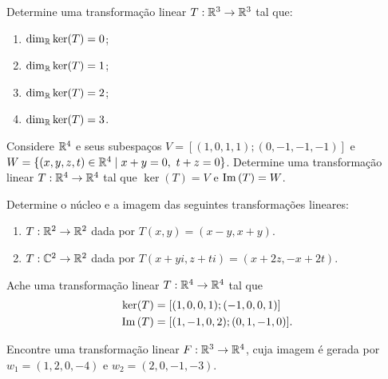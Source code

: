 \documentclass[12pt]{exam}
\begin{document}
\begin{exercicio}
    Determine uma transformação linear $T : \mathbb{R}^3 \to \mathbb{R}^3$ tal que:
    \begin{enumerate}[label={\alph*})]
        \item $\dim_{\mathbb{R}} \ker(T) = 0$;

        \item $\dim_{\mathbb{R}} \ker(T) = 1$;

        \item $\dim_{\mathbb{R}} \ker(T) = 2$;

        \item $\dim_{\mathbb{R}} \ker(T) = 3$.
    \end{enumerate}
\end{exercicio}

\begin{exercicio}
    Considere $\mathbb{R}^4$ e seus subespaços $V = [(1,0,1,1);(0,-1,-1,-1)]$ e $W = \{(x,y,z,t) \in \mathbb{R}^4 \mid x + y = 0,\ t + z = 0\}$. Determine uma transformação linear $T : \mathbb{R}^4 \to \mathbb{R}^4$ tal que $\ker(T) = V$ e ${\rm Im\,}(T) = W$.
\end{exercicio}

\begin{exercicio}
    Determine o núcleo e a imagem das seguintes transformações lineares:
    \begin{enumerate}[label={\alph*})]
        \item $T : \mathbb{R}^2 \to \mathbb{R}^2$ dada por $T(x,y) = (x - y, x + y)$.

        \item $T : \mathbb{C}^2 \to \mathbb{R}^2$ dada por $T(x + yi,z + ti) = (x + 2z, -x + 2t)$.
    \end{enumerate}
\end{exercicio}

\begin{exercicio}
    Ache uma transformação linear $T : \mathbb{R}^4 \to \mathbb{R}^4$ tal que
    \begin{align*}
        \ker(T) &= [(1,0,0,1);(-1,0,0,1)]\\
        {\rm Im\,}(T) &= [(1,-1,0,2);(0,1,-1,0)].
    \end{align*}
\end{exercicio}

\begin{exercicio}
    Encontre uma transformação linear $F : \mathbb{R}^3 \to \mathbb{R}^4$, cuja imagem é gerada por $w_1 = (1,2,0,-4)$ e $w_2 = (2,0,-1,-3)$.
\end{exercicio}
\end{document}
